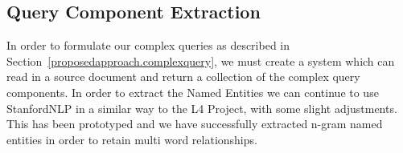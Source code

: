\documentclass{mprop}
\begin{document}



\subsection{Query Component Extraction}
In order to formulate our complex queries as described in Section~\ref{proposedapproach.complexquery}, we must create a system which can read in a source document and return a collection of the complex query components. 
In order to extract the Named Entities we can continue to use StanfordNLP in a similar way to the L4 Project, with some slight adjustments.
This has been prototyped and we have successfully extracted n-gram named entities in order to retain multi word relationships.
\end{document}
